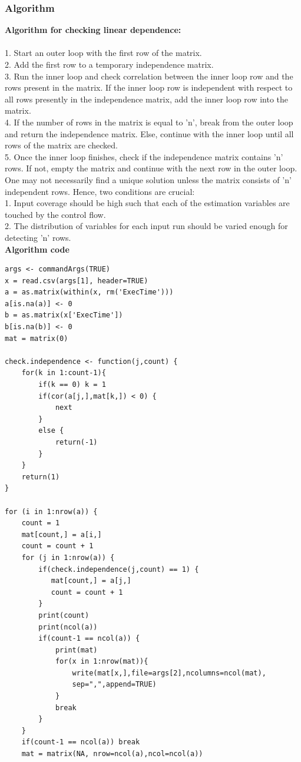 \documentclass[11pt]{article}
\begin{document}
\subsubsection{Algorithm}
\textbf{Algorithm for checking linear dependence:}\\
\\1. Start an outer loop with the first row of the matrix. \\
2. Add the first row to a temporary independence matrix.\\
3. Run the inner loop and check correlation between the inner loop row and the rows present in the matrix. If the inner loop row is independent with respect to all rows presently in the independence matrix, add the inner loop row into the matrix.\\
4. If the number of rows in the matrix is equal to 'n', break from the outer loop and return the independence matrix. Else, continue with the inner loop until all rows of the matrix are checked.\\
5. Once the inner loop finishes, check if the independence matrix contains 'n' rows. If not, empty the matrix and continue with the next row in the outer loop. \newline
\\One may not necessarily find a unique solution unless the matrix consists of 'n' independent rows. Hence, two conditions are crucial:\\
1. Input coverage should be high such that each of the estimation variables are touched by the control flow.\\
2. The distribution of variables for each input run should be varied enough for detecting 'n' rows.\newline
\\\textbf{Algorithm code}
\begin{lstlisting}
args <- commandArgs(TRUE)
x = read.csv(args[1], header=TRUE)
a = as.matrix(within(x, rm('ExecTime')))
a[is.na(a)] <- 0
b = as.matrix(x['ExecTime'])
b[is.na(b)] <- 0
mat = matrix(0)

check.independence <- function(j,count) {
    for(k in 1:count-1){
        if(k == 0) k = 1
        if(cor(a[j,],mat[k,]) < 0) {
            next
        }
        else {
            return(-1)
        }
    }
    return(1)
}

for (i in 1:nrow(a)) {
    count = 1
    mat[count,] = a[i,]
    count = count + 1
    for (j in 1:nrow(a)) {
        if(check.independence(j,count) == 1) {
           mat[count,] = a[j,]
           count = count + 1
        }
        print(count)
        print(ncol(a))
        if(count-1 == ncol(a)) {
            print(mat)
            for(x in 1:nrow(mat)){
                write(mat[x,],file=args[2],ncolumns=ncol(mat),
                sep=",",append=TRUE)
            }
            break
        }
    }
    if(count-1 == ncol(a)) break
    mat = matrix(NA, nrow=ncol(a),ncol=ncol(a))
\end{lstlisting}
\end{document}
